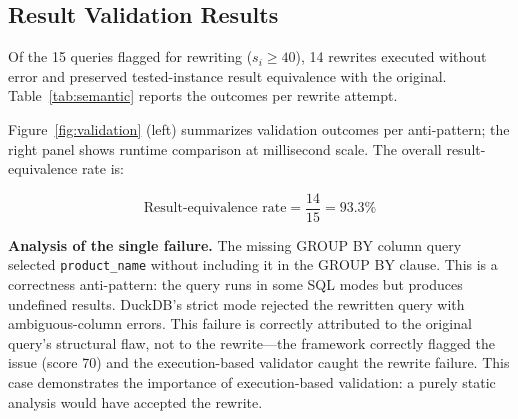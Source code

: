 \documentclass[conference]{IEEEtran}
\begin{document}
\subsection{Result Validation Results}
Of the 15 queries flagged for rewriting ($s_i \geq 40$), 14 rewrites executed without error and preserved tested-instance result equivalence with the original. Table~\ref{tab:semantic} reports the outcomes per rewrite attempt.

\begin{table}[t]
\caption{Result Validation Outcomes}
\label{tab:semantic}
\centering
\small
{}
\end{table}

Figure~\ref{fig:validation} (left) summarizes validation outcomes per anti-pattern; the right panel shows runtime comparison at millisecond scale.
The overall result-equivalence rate is:

\begin{equation}
\text{Result-equivalence rate} = \frac{14}{15} = 93.3\%
\label{eq:result_rate}
\end{equation}

\textbf{Analysis of the single failure.} The missing GROUP BY column query selected \texttt{product\_name} without including it in the GROUP BY clause. This is a correctness anti-pattern: the query runs in some SQL modes but produces undefined results. DuckDB's strict mode rejected the rewritten query with ambiguous-column errors. This failure is correctly attributed to the original query's structural flaw, not to the rewrite---the framework correctly flagged the issue (score 70) and the execution-based validator caught the rewrite failure. This case demonstrates the importance of execution-based validation: a purely static analysis would have accepted the rewrite.
\end{document}
